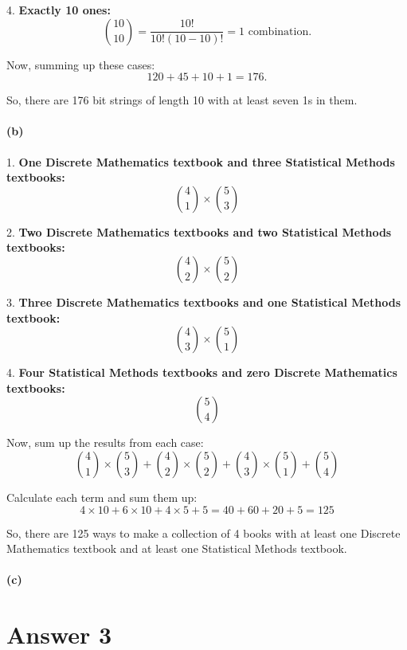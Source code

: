 \documentclass[12pt]{article}
\begin{document}
4. \textbf{Exactly 10 ones:}
   \[
   \binom{10}{10} = \frac{10!}{10!(10-10)!} = 1 \text{ combination.}
   \]

Now, summing up these cases:
\[
120 + 45 + 10 + 1 = 176.
\]

So, there are 176 bit strings of length 10 with at least seven 1s in them.


\paragraph{(b)}

1. \textbf{One Discrete Mathematics textbook and three Statistical Methods textbooks:}
   \[
   \binom{4}{1} \times \binom{5}{3}
   \]

2. \textbf{Two Discrete Mathematics textbooks and two Statistical Methods textbooks:}
   \[
   \binom{4}{2} \times \binom{5}{2}
   \]

3. \textbf{Three Discrete Mathematics textbooks and one Statistical Methods textbook:}
   \[
   \binom{4}{3} \times \binom{5}{1}
   \]

4. \textbf{Four Statistical Methods textbooks and zero Discrete Mathematics textbooks:}
   \[
   \binom{5}{4}
   \]

Now, sum up the results from each case:
\[
\binom{4}{1} \times \binom{5}{3} + \binom{4}{2} \times \binom{5}{2} + \binom{4}{3} \times \binom{5}{1} + \binom{5}{4}
\]

Calculate each term and sum them up:
\[
4 \times 10 + 6 \times 10 + 4 \times 5 + 5 = 40 + 60 + 20 + 5 = 125
\]

So, there are 125 ways to make a collection of 4 books with at least one Discrete Mathematics textbook and at least one Statistical Methods textbook.


\paragraph{(c)}


\section*{Answer 3}
\end{document}
